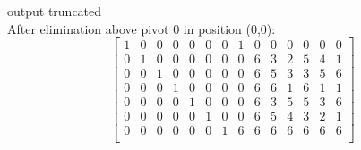 output truncated \\


\noindent After elimination above pivot 0 in position (0,0):\\
$$
\left[
\begin{array}{*{14}{c}}
1 & 0 & 0 & 0 & 0 & 0 & 0 & 1 & 0 & 0 & 0 & 0 & 0 & 0\\
0 & 1 & 0 & 0 & 0 & 0 & 0 & 0 & 6 & 3 & 2 & 5 & 4 & 1\\
0 & 0 & 1 & 0 & 0 & 0 & 0 & 0 & 6 & 5 & 3 & 3 & 5 & 6\\
0 & 0 & 0 & 1 & 0 & 0 & 0 & 0 & 6 & 6 & 1 & 6 & 1 & 1\\
0 & 0 & 0 & 0 & 1 & 0 & 0 & 0 & 6 & 3 & 5 & 5 & 3 & 6\\
0 & 0 & 0 & 0 & 0 & 1 & 0 & 0 & 6 & 5 & 4 & 3 & 2 & 1\\
0 & 0 & 0 & 0 & 0 & 0 & 1 & 6 & 6 & 6 & 6 & 6 & 6 & 6\\
\end{array}
\right]
$$
